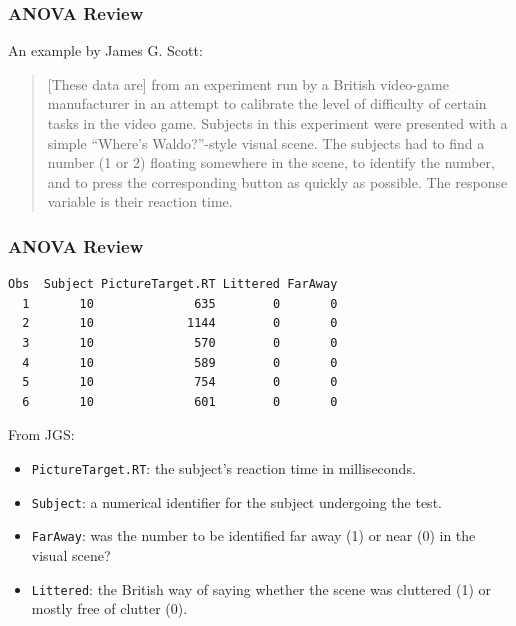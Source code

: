 \documentclass[slidestop,compress,mathserif,12pt,t,professionalfonts,xcolor=table]{beamer}
\begin{document}
\begin{frame}
  \frametitle{ANOVA Review}

\vfill

An example by James G. Scott:
\begin{quote} 
[These data are] from an experiment run by a British video-game manufacturer in an attempt to calibrate the level of difficulty of certain tasks in the video game. Subjects in this experiment were presented with a simple “Where’s Waldo?”-style visual scene. The subjects had to find a number (1 or 2) floating somewhere in the scene, to identify the number, and to press the corresponding button as quickly as possible. The response variable is their reaction time.
\end{quote}

\vfill

\end{frame}


\begin{frame}[fragile]
  \frametitle{ANOVA Review}
  
\begin{center}
{\small
\begin{verbatim}
Obs  Subject PictureTarget.RT Littered FarAway
  1       10              635        0       0
  2       10             1144        0       0
  3       10              570        0       0
  4       10              589        0       0
  5       10              754        0       0
  6       10              601        0       0
\end{verbatim}
}
\end{center}

\small
{\tiny From JGS:}
\begin{itemize}
\item \texttt{PictureTarget.RT}: the subject’s reaction time in milliseconds.
\item \texttt{Subject}: a numerical identifier for the subject undergoing the test.
\item \texttt{FarAway}: was the number to be identified far away (1) or near (0) in the visual scene?
\item \texttt{Littered}: the British way of saying whether the scene was cluttered (1) or mostly free of clutter (0).
\end{itemize}

\end{frame}


\end{document}
